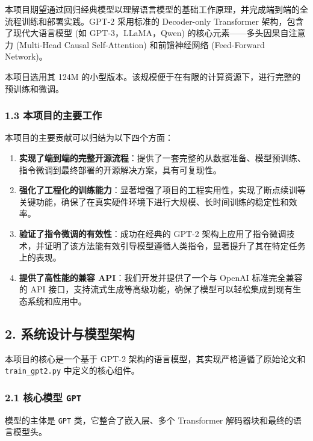 \documentclass[a4paper]{article}
\providecommand{\tightlist}{%
  \setlength{\itemsep}{0pt}\setlength{\parskip}{0pt}}
\begin{document}
本项目期望通过回归经典模型以理解语言模型的基础工作原理，并完成端到端的全流程训练和部署实践。GPT-2
采用标准的 Decoder-only Transformer 架构，包含了现代大语言模型 (如
GPT-3，LLaMA，Qwen) 的核心元素------多头因果自注意力 (Multi-Head Causal
Self-Attention) 和前馈神经网络 (Feed-Forward Network)。

本项目选用其 124M
的小型版本。该规模便于在有限的计算资源下，进行完整的预训练和微调。

\subsubsection{1.3
本项目的主要工作}\label{ux672cux9879ux76eeux7684ux4e3bux8981ux5de5ux4f5c}

本项目的主要贡献可以归结为以下四个方面：

\begin{enumerate}
\def\labelenumi{\arabic{enumi}.}
\tightlist
\item
  \textbf{实现了端到端的完整开源流程}：提供了一套完整的从数据准备、模型预训练、指令微调到最终部署的开源解决方案，具有可复现性。
\item
  \textbf{强化了工程化的训练能力}：显著增强了项目的工程实用性，实现了断点续训等关键功能，确保了在真实硬件环境下进行大规模、长时间训练的稳定性和效率。
\item
  \textbf{验证了指令微调的有效性}：成功在经典的 GPT-2
  架构上应用了指令微调技术，并证明了该方法能有效引导模型遵循人类指令，显著提升了其在特定任务上的表现。
\item
  \textbf{提供了高性能的兼容 API}：我们开发并提供了一个与 OpenAI
  标准完全兼容的 API
  接口，支持流式生成等高级功能，确保了模型可以轻松集成到现有生态系统和应用中。
\end{enumerate}

\subsection{2.
系统设计与模型架构}\label{ux7cfbux7edfux8bbeux8ba1ux4e0eux6a21ux578bux67b6ux6784}

本项目的核心是一个基于 GPT-2 架构的语言模型，其实现严格遵循了原始论文和
\texttt{train\_gpt2.py} 中定义的核心组件。

\subsubsection{\texorpdfstring{2.1 核心模型
\texttt{GPT}}{2.1 核心模型 GPT}}\label{ux6838ux5fc3ux6a21ux578b-gpt}

模型的主体是 \texttt{GPT} 类，它整合了嵌入层、多个 Transformer
解码器块和最终的语言模型头。
\end{document}
